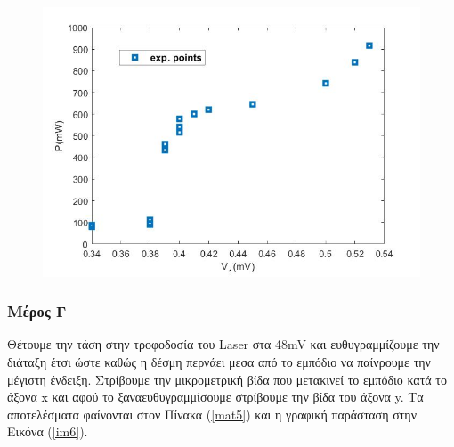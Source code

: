 \documentclass[a4paper]{article}
\begin{document}
	\begin{figure}[h!]
		\centering
		\includegraphics[width=0.8\linewidth]{plot4.jpg}
		\caption{ }
		\label{im5}
	\end{figure}
	
	
	\subsubsection*{Μέρος Γ}
		Θέτουμε την τάση στην τροφοδοσία του Laser στα 48mV και ευθυγραμμίζουμε την διάταξη έτσι ώστε καθώς η δέσμη περνάει μεσα από το εμπόδιο να παίνρουμε την μέγιστη ένδειξη. Στρίβουμε την μικρομετρική βίδα που μετακινεί το εμπόδιο κατά το άξονα x και αφού το ξαναευθυγραμμίσουμε στρίβουμε την βίδα του άξονα y. Τα αποτελέσματα φαίνονται στον Πίνακα (\ref{mat5}) και η γραφική παράσταση στην Εικόνα (\ref{im6}).
		
\end{document}
